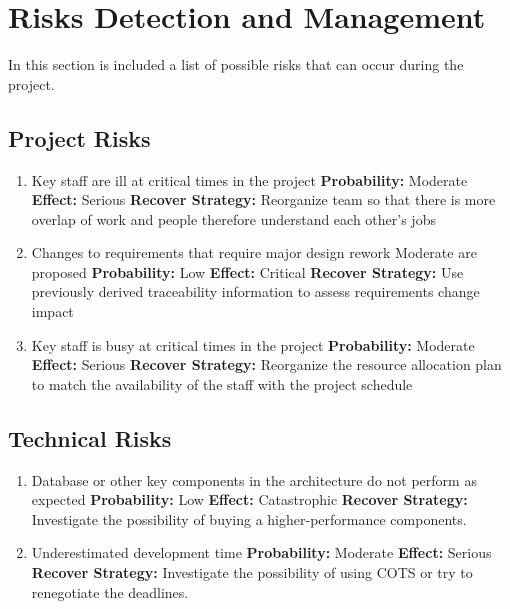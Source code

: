 \documentclass[11pt,titlepage]{article} %
\begin{document}
\newpage
\section{Risks Detection and Management}
In this section is included a list of possible risks that can occur during the project.\newline

\subsection{Project Risks}
  \begin{enumerate}
   \item Key staff are ill at critical times in the project\newline
	 \textbf{Probability:} Moderate\newline
	 \textbf{Effect:} Serious\newline
	 \textbf{Recover Strategy:} Reorganize team so that there is more overlap of work and people therefore understand each other’s jobs\newline
  \item Changes to requirements that require major design rework Moderate are proposed
	 \textbf{Probability:} Low\newline
	 \textbf{Effect:} Critical\newline
	 \textbf{Recover Strategy:} Use previously derived traceability information to assess requirements change impact
  \item Key staff is busy at critical times in the project\newline
	\textbf{Probability:} Moderate\newline
	\textbf{Effect:} Serious\newline
	\textbf{Recover Strategy: } Reorganize the resource allocation plan to match the availability of the staff with the project schedule 
  \end{enumerate}

\subsection{Technical Risks}
  \begin{enumerate}
   \item Database or other key components in the architecture do not perform as expected\newline
    \textbf{Probability:} Low\newline
    \textbf{Effect:} Catastrophic\newline
    \textbf{Recover Strategy:} Investigate the possibility of buying a higher-performance components.\newline
   \item Underestimated development time\newline
    \textbf{Probability:} Moderate\newline
    \textbf{Effect:} Serious\newline
    \textbf{Recover Strategy:} Investigate the possibility of using COTS or try to renegotiate the deadlines.\newline
  \end{enumerate}
\end{document}
